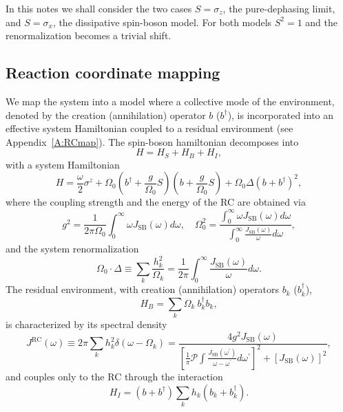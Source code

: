 \documentclass[%
preprint,
onecolumn,
notitlepag,
 amsmath,amssymb,
 aps,
 pra,
]{revtex4-2}
\begin{document}
In this notes we shall consider the two cases $S = \sigma_{z}$, the pure-dephasing limit, and $S = \sigma_{x}$, the dissipative spin-boson model. For both models $S^2 =1$ and the renormalization becomes a trivial shift.

\subsection{Reaction coordinate mapping}

We map the system  into a model where a collective mode of the environment, denoted by the creation (annihilation) operator $b$ ($b^{\dag}$), is incorporated into an effective system Hamiltonian coupled to a residual environment (see Appendix~\ref{A:RCmap}). The spin-boson hamiltonian decomposes into
\begin{equation}
H = H_{S} + H_{B} + H_{I},
\end{equation}
with a system Hamiltonian
\begin{equation}
H=\frac{\omega}{2} \sigma^{z}+\Omega_{0}\left(b^{\dagger}+\frac{g}{\Omega_{0}} S\right)\left(b+\frac{g}{\Omega_{0}} S\right)+ \Omega_{0} \Delta (b + b^{\dag})^{2},
\end{equation}
where the coupling strength and the energy of the RC are obtained via
\begin{equation}
g^{2}=\frac{1}{2 \pi \Omega_{0}} \int_{0}^{\infty} \omega J_{\text{SB}}(\omega) d \omega, 
\quad
\Omega_{0}^{2}=\frac{\int_{0}^{\infty} \omega J_{\text{SB}}(\omega) d \omega}{\int_{0}^{\infty} \frac{J_{\text{SB}}(\omega)}{\omega} d \omega},
\end{equation} 
and the system renormalization
\begin{equation}
\Omega_{0} \cdot \Delta \equiv \sum_{k} \frac{h_{k}^{2}}{\Omega_{k}}=\frac{1}{2 \pi} \int_{0}^{\infty} \frac{J_{\text{SB}}(\omega)}{\omega} d \omega.
\end{equation}
The residual environment, with creation (annihilation) operators $b_{k}$ ($b_{k}^{\dag}$),
\begin{equation}
H_{B}= \sum_{k} \Omega_{k}\ b_{k}^{\dagger} b_{k}, 
\end{equation}
is characterized by its spectral density
\begin{equation}
J^{\text{RC}}(\omega) \equiv 2 \pi \sum_{k} h_k^2 \delta(\omega-\Omega_k) = \frac{4 g^{2} J_{\text{SB}}(\omega)}{\left[\frac{1}{\pi} \mathcal{P} \int \frac{J_{\text{SB}}\left(\omega^{\prime}\right)}{\omega-\omega^{\prime}} d \omega^{\prime}\right]^{2}+\left[J_{\text{SB}}(\omega)\right]^{2}},
\end{equation}
and couples only to the RC through the interaction 
\begin{equation}
H_{I} = (b + b^{\dag}) \sum_{k} h_{k} (b_{k} + b_{k}^{\dagger}). 
\end{equation}
\end{document}
